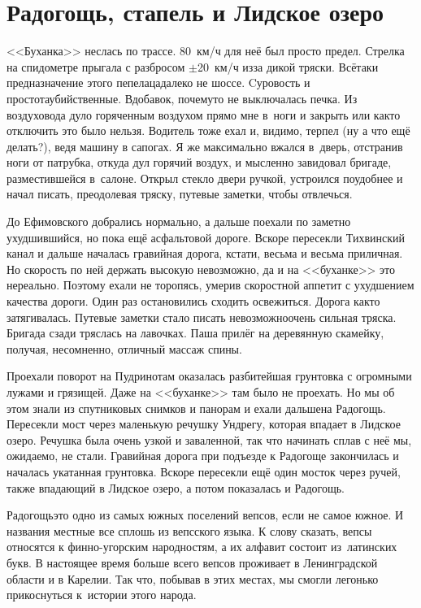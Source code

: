 \chapter{Радогощь, стапель и Лидское озеро} 
\vspace{-1.5cm}
\vepsianrose

<<Буханка>> неслась по трассе. 80~км/ч для неё был просто предел. Стрелка на спидометре прыгала с разбросом $\pm$20~км/ч из\sdash за дикой тряски. Всё\sdash таки предназначение этого пепелаца\mdash далеко не шоссе. Cуровость и простота\mdash убийственные. Вдобавок, почему\sdash то не выключалась печка. Из воздуховода дуло горяченным воздухом прямо мне в~ноги и закрыть или как\sdash то отключить это было нельзя. Водитель тоже ехал и, видимо, терпел (ну а что ещё делать?), ведя машину в сапогах. Я же максимально вжался в~дверь, отстранив ноги от патрубка, откуда дул горячий воздух, и мысленно завидовал бригаде, разместившейся в~салоне. Открыл стекло двери ручкой, устроился поудобнее и начал писать, преодолевая тряску, путевые заметки, чтобы отвлечься. 

До Ефимовского добрались нормально, а дальше поехали по заметно ухудшившийся, но пока ещё асфальтовой дороге. Вскоре пересекли Тихвинский канал и дальше началась гравийная дорога, кстати, весьма и весьма приличная. Но скорость по ней держать высокую невозможно, да и на <<буханке>> это нереально. Поэтому ехали не торопясь, умерив скоростной аппетит с ухудшением качества дороги. Один раз остановились сходить освежиться. Дорога как\sdash то затягивалась. Путевые заметки стало писать невозможно\mdash очень сильная тряска. Бригада сзади тряслась на лавочках. Паша прилёг на деревянную скамейку, получая, несомненно, отличный массаж спины.

Проехали поворот на Пудрино\mdash там оказалась разбитейшая грунтовка с огромными лужами и грязищей. Даже на <<буханке>> там было не проехать. Но мы об этом знали из спутниковых снимков и панорам и ехали дальше\mdash на Радогощь. Пересекли мост через маленькую речушку Ундрегу, которая впадает в Лидское озеро. Речушка была очень узкой и заваленной, так что начинать сплав с неё мы, ожидаемо, не стали. Гравийная дорога при подъезде к Радогоще закончилась и началась укатанная грунтовка. Вскоре пересекли ещё один мосток через ручей, также впадающий в Лидское озеро, а потом показалась и Радогощь. 

Радогощь\mdash это одно из самых южных поселений вепсов, если не самое южное. И названия местные все сплошь из вепсского языка. К слову сказать, вепсы относятся к финно-угорским народностям, а их алфавит состоит из~латинских букв. В настоящее время больше всего вепсов проживает в Ленинградской области и в Карелии. Так что, побывав в этих местах, мы смогли легонько прикоснуться к~истории этого народа. 

